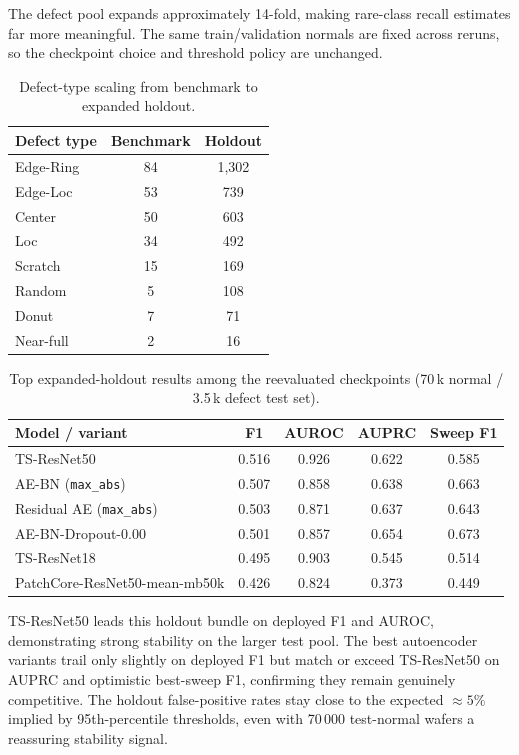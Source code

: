\documentclass[11pt]{article}
\begin{document}
The defect pool expands approximately 14-fold, making rare-class recall estimates
far more meaningful.  The same train/validation normals are fixed across reruns,
so the checkpoint choice and threshold policy are unchanged.

\begin{table}[H]
\centering
\caption{Defect-type scaling from benchmark to expanded holdout.}
\label{tab:holdout_defects}
\begin{tabular}{lcc}
\toprule
Defect type & Benchmark & Holdout \\
\midrule
Edge-Ring & 84  & 1{,}302 \\
Edge-Loc  & 53  & 739     \\
Center    & 50  & 603     \\
Loc       & 34  & 492     \\
Scratch   & 15  & 169     \\
Random    &  5  & 108     \\
Donut     &  7  &  71     \\
Near-full &  2  &  16     \\
\bottomrule
\end{tabular}
\end{table}

\begin{table}[H]
\centering
\caption{Top expanded-holdout results among the reevaluated checkpoints
(70\,k normal / 3.5\,k defect test set).}
\label{tab:holdout_leaderboard}
\begin{tabularx}{\linewidth}{>{\raggedright\arraybackslash}Xcccc}
\toprule
Model / variant & F1 & AUROC & AUPRC & Sweep F1 \\
\midrule
TS-ResNet50                      & 0.516 & 0.926 & 0.622 & 0.585 \\
AE-BN (\texttt{max\_abs})        & 0.507 & 0.858 & 0.638 & 0.663 \\
Residual AE (\texttt{max\_abs})  & 0.503 & 0.871 & 0.637 & 0.643 \\
AE-BN-Dropout-0.00               & 0.501 & 0.857 & 0.654 & 0.673 \\
TS-ResNet18                      & 0.495 & 0.903 & 0.545 & 0.514 \\
PatchCore-ResNet50-mean-mb50k    & 0.426 & 0.824 & 0.373 & 0.449 \\
\bottomrule
\end{tabularx}
\end{table}

TS-ResNet50 leads this holdout bundle on deployed F1 and AUROC, demonstrating
strong stability on the larger test pool.  The best autoencoder variants trail
only slightly on deployed F1 but match or exceed TS-ResNet50 on AUPRC and
optimistic best-sweep F1, confirming they remain genuinely competitive.
The holdout false-positive rates stay close to the expected ${\approx}5\%$
implied by 95th-percentile thresholds, even with 70\,000 test-normal wafers
a reassuring stability signal.
\end{document}
